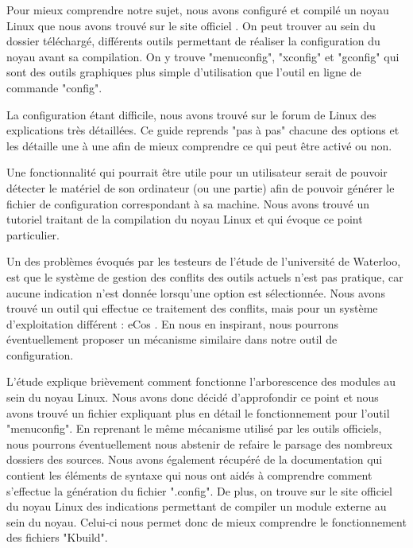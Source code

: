 \documentclass[16pts]{report}
\begin{document}
Pour mieux comprendre notre sujet, nous avons configuré et compilé un noyau
Linux que nous avons trouvé sur le site officiel \cite{Kernel}. On peut trouver
au sein du dossier téléchargé, différents outils permettant de réaliser la
configuration du noyau avant sa compilation. On y trouve "menuconfig", "xconfig"
et "gconfig" qui sont des outils graphiques plus simple d'utilisation que
l'outil en ligne de commande "config".

La configuration étant difficile, nous avons trouvé sur le forum de Linux
\cite{Existant:Kernel:ForumTutoConfig} des explications très détaillées. Ce
guide reprends "pas à pas" chacune des options et les détaille une à une afin de
mieux comprendre ce qui peut être activé ou non.

Une fonctionnalité qui pourrait être utile pour un utilisateur serait de pouvoir
détecter le matériel de son ordinateur (ou une partie) afin de pouvoir générer
le fichier de configuration correspondant à sa machine. Nous avons trouvé un
tutoriel \cite{Existant:Kernel:outils} traitant de la compilation du noyau Linux
et qui évoque ce point particulier.

Un des problèmes évoqués par les testeurs de l'étude \cite{Waterloo:Etude} de
l'université de Waterloo, est que le système de gestion des conflits des outils
actuels n'est pas pratique, car aucune indication n'est donnée lorsqu'une option
est sélectionnée. Nous avons trouvé un outil qui effectue ce traitement des
conflits, mais pour un système d'exploitation différent : eCos
\cite{Existant:EcosConfig}. En nous en inspirant, nous pourrons éventuellement
proposer un mécanisme similaire dans notre outil de configuration.


L'étude \cite{Waterloo:Etude} explique brièvement comment fonctionne
l'arborescence des modules au sein du noyau Linux. Nous avons donc décidé
d'approfondir ce point et nous avons trouvé un fichier
\cite{Existant:Kconfig:frontends} expliquant plus en détail le fonctionnement
pour l'outil "menuconfig". En reprenant le même mécanisme utilisé par les outils
officiels, nous pourrons éventuellement nous abstenir de refaire le parsage des
nombreux dossiers des sources. Nous avons également récupéré de la documentation
\cite{Existant:Kconfig:vueDensemble} \cite{Existant:Kconfig:langage} qui
contient les éléments de syntaxe qui nous ont aidés à comprendre comment
s'effectue la génération du fichier ".config". De plus, on trouve sur le site
officiel du noyau Linux des indications \cite{Existant:Kconfig:modules}
permettant de compiler un module externe au sein du noyau. Celui-ci nous permet
donc de mieux comprendre le fonctionnement des fichiers "Kbuild".

\end{document}
